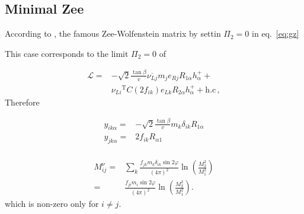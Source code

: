 \subsection{Minimal Zee}
According to \cite{hep-ph/0307172}, the famous Zee-Wolfenstein matrix by settin $\Pi_2=0$ in eq.~\eqref{eq:gz}


This case corresponds to the limit $\Pi_2=0$ of ~\cite{AristizabalSierra:2006ri}

\begin{align}
  \mathcal{L}=&-\sqrt{2}\frac{\tan\beta}{v}\overline{\nu_{Lj}}m_j e_{Rj}R_{1\alpha}h_{\alpha}^{+}+ \nonumber\\
              &{\nu_{Li}}^{\text{T}}C \left( 2 f_{ik} \right)e_{Lk}R_{2\alpha}h_{\alpha}^{+}+\text{h.c}\,,
\end{align}
Therefore

\begin{align}
  y_{i k\alpha}=& -\sqrt{2}\frac{\tan\beta}{v}m_k \delta_{ik}R_{1\alpha} \nonumber\\
  y_{j k\alpha}=&2f_{i k}R_{\alpha 1} \nonumber\\
\end{align}

\begin{align}
  M^{\nu}_{ij}
=&\sum_k \frac{f_{jk}m_k \delta_{ik} \sin2\varphi }{(4\pi)^2}
\ln \left( \frac{M_2^2}{M_1^2}\right) \nonumber\\
=& \frac{f_{ji}m_i\sin2\varphi }{(4\pi)^2}
\ln \left( \frac{M_2^2}{M_1^2}\right).
\end{align}
which is non-zero only for $i\ne j$.

